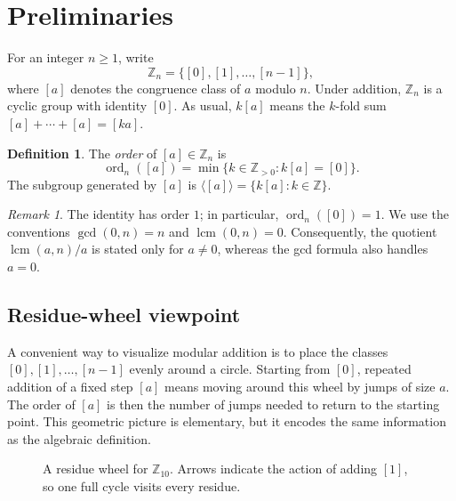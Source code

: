 \documentclass[11pt,a4paper]{article}
\theoremstyle{definition}
\newtheorem{definition}[theorem]{Definition}
\theoremstyle{remark}
\newtheorem{remark}[theorem]{Remark}
\DeclareMathOperator{\ord}{ord}
\DeclareMathOperator{\lcm}{lcm}
\begin{document}
\section{Preliminaries}
For an integer $n\ge 1$, write
\[
\mathbb Z_n=\{[0],[1],\ldots,[n-1]\},
\]
where $[a]$ denotes the congruence class of $a$ modulo $n$. Under addition, $\mathbb Z_n$ is a cyclic group with identity $[0]$. As usual, $k[a]$ means the $k$-fold sum $[a]+\cdots+[a]=[ka]$.

\begin{definition}
The \emph{order} of $[a]\in\mathbb Z_n$ is
\[
\ord_n([a])=\min\{k\in\mathbb Z_{>0}:k[a]=[0]\}.
\]
The subgroup generated by $[a]$ is $\langle[a]\rangle=\{k[a]:k\in\mathbb Z\}$.
\end{definition}

\begin{remark}
The identity has order $1$; in particular, $\ord_n([0])=1$. We use the conventions $\gcd(0,n)=n$ and $\lcm(0,n)=0$. Consequently, the quotient $\lcm(a,n)/a$ is stated only for $a\ne0$, whereas the gcd formula also handles $a=0$.
\end{remark}

\subsection*{Residue-wheel viewpoint}
A convenient way to visualize modular addition is to place the classes $[0],[1],\ldots,[n-1]$ evenly around a circle. Starting from $[0]$, repeated addition of a fixed step $[a]$ means moving around this wheel by jumps of size $a$. The order of $[a]$ is then the number of jumps needed to return to the starting point. This geometric picture is elementary, but it encodes the same information as the algebraic definition.

\begin{figure}[ht]
\centering
{}
\caption{A residue wheel for $\mathbb Z_{10}$. Arrows indicate the action of adding $[1]$, so one full cycle visits every residue.}
\label{fig:z10wheel}
\end{figure}
\end{document}
